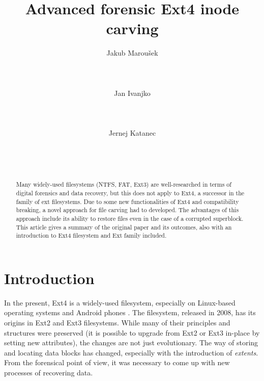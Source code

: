 \documentclass{acm_proc_article-sp}
\begin{document}
\title{Advanced forensic Ext4 inode carving}

\author{
\alignauthor Jakub Marou\v sek \\
	\\
    \\
    \\
\alignauthor Jan Ivanjko \\
	\\
    \\
    \\
\alignauthor Jernej Katanec \\
	\\
    \\
    \\
}

\maketitle
\begin{abstract}
Many widely-used filesystems (NTFS, FAT, Ext3) are well-researched in terms of digital forensics and data recovery, but this does not apply to Ext4, a successor in the family of ext filesystems. Due to some new functionalities of Ext4 and compatibility breaking, a novel approach for file carving had to developed. The advantages of this approach include its ability to restore files even in the case of a corrupted superblock. This article gives a summary of the original paper and its outcomes, also with an introduction to Ext4 filesystem and Ext family included.
\end{abstract}

\section{Introduction}

In the present, Ext4 is a widely-used filesystem, especially on Linux-based operating systems and Android phones \cite{afeic}. The filesystem, released in 2008, has its origins in Ext2 and Ext3 filesystems. While many of their principles and structures were preserved (it is possible to upgrade from Ext2 or Ext3 in-place by setting new attributes), the changes are not just evolutionary. The way of storing and locating data blocks has changed, especially with the introduction of {\it extents}. From the forensical point of view, it was necessary to come up with new processes of recovering data.
\end{document}
